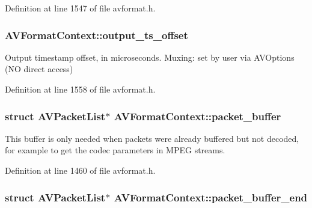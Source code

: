 Definition at line 1547 of file avformat.\+h.

\subsubsection[{\texorpdfstring{output\+\_\+ts\+\_\+offset}{output_ts_offset}}]{ A\+V\+Format\+Context\+::output\+\_\+ts\+\_\+offset}\hypertarget{struct_a_v_format_context_a711dc3e6159c44dc31843f915b893a12}{}\label{struct_a_v_format_context_a711dc3e6159c44dc31843f915b893a12}
Output timestamp offset, in microseconds. Muxing\+: set by user via A\+V\+Options (NO direct access) 

Definition at line 1558 of file avformat.\+h.

\subsubsection[{\texorpdfstring{packet\+\_\+buffer}{packet_buffer}}]{\setlength{\rightskip}{0pt plus 5cm}struct {\bf A\+V\+Packet\+List}$\ast$ A\+V\+Format\+Context\+::packet\+\_\+buffer}\hypertarget{struct_a_v_format_context_ae08f4cb8a9362e1701e2a511c820471a}{}\label{struct_a_v_format_context_ae08f4cb8a9362e1701e2a511c820471a}
This buffer is only needed when packets were already buffered but not decoded, for example to get the codec parameters in M\+P\+EG streams. 

Definition at line 1460 of file avformat.\+h.

\subsubsection[{\texorpdfstring{packet\+\_\+buffer\+\_\+end}{packet_buffer_end}}]{\setlength{\rightskip}{0pt plus 5cm}struct {\bf A\+V\+Packet\+List}$\ast$ A\+V\+Format\+Context\+::packet\+\_\+buffer\+\_\+end}\hypertarget{struct_a_v_format_context_a7d695eaac54a6de2dddc444a34d7ed05}{}\label{struct_a_v_format_context_a7d695eaac54a6de2dddc444a34d7ed05}


